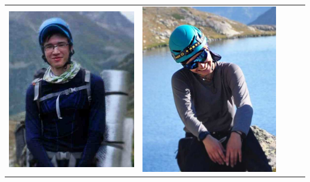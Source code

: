 \documentclass[
11pt, %
]{beamer}
\newcommand\rozhasize{0.17\textwidth}
\begin{document}
\begin{frame}
\begin{tabular}{ccccc}
\begin{minipage}{\rozhasize}
		\includegraphics[width=\textwidth]{../pics/portraits/dima_s2}
	\end{minipage} &
	\begin{minipage}{\rozhasize}
		\includegraphics[width=\textwidth]{../pics/portraits/katya}

\end{minipage}
\end{tabular}
\end{frame}
\end{document}
